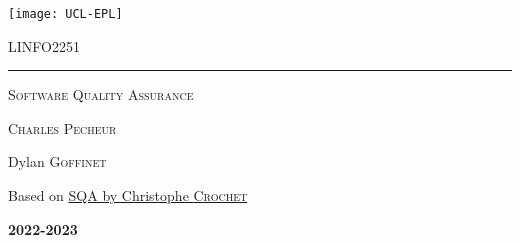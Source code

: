 \documentclass{customSynthesis}
\begin{document}

\begin{titlepage}
	\flushleft\texttt{[image: UCL-EPL]}\\
	\vspace*{2cm}
	\vspace*{\fill}
	\centering
	{\scshape\LARGE LINFO2251 \par}
	\vspace{0.4cm}
	{\color{clearBlue}\rule{0.7\textwidth}{1pt}\par}
	\vspace{0.5cm}
	{\scshape\Large Software Quality Assurance \par}
	\vspace{0.5cm}
	{\scshape\large Charles Pecheur\par}
	\vspace{1cm}
	{\scshape\large  \par} %
	{\Large\itshape\par}
	\vspace*{\fill}
	\vfill
	\vfill
	{\Large Dylan \textsc{Goffinet}\par}
	\vspace{0.2cm}
	{\small Based on \href{https://www.overleaf.com/4685621966pzdpvkrkszhq}{SQA by Christophe \textsc{Crochet}}\par}
	\vspace{0.5cm}
	{\Large\bfseries 2022-2023\par}
	{\large \par}
\end{titlepage}


\tableofcontents{}
\setcounter{tocdepth}{1} %
\clearpage
\pagestyle{fancy}




\end{document}
